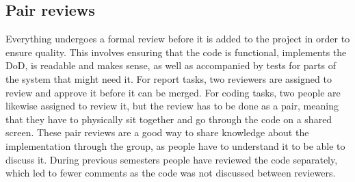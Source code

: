 \subsection{Pair reviews}
Everything undergoes a formal review before it is added to the project in order to ensure quality.
This involves ensuring that the code is functional, implements the DoD, is readable and makes sense, as well as accompanied by tests for parts of the system that might need it.
For report tasks, two reviewers are assigned to review and approve it before it can be merged.
For coding tasks, two people are likewise assigned to review it, but the review has to be done as a pair, meaning that they have to physically sit together and go through the code on a shared screen.
These pair reviews are a good way to share knowledge about the implementation through the group, as people have to understand it to be able to discuss it.
During previous semesters people have reviewed the code separately, which led to fewer comments as the code was not discussed between reviewers.
